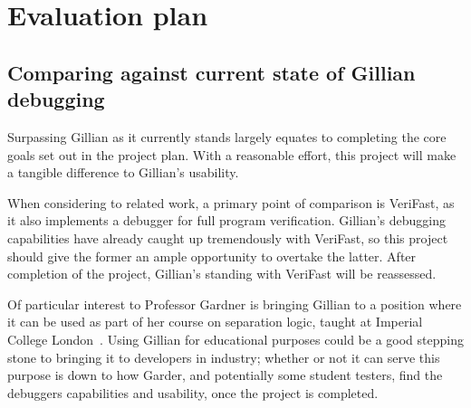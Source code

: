 \chapter{Evaluation plan}
\label{cha:eval}
\section{Comparing against current state of Gillian debugging}

Surpassing Gillian as it currently stands largely equates to completing the
core goals set out in the project plan. With a reasonable effort, this project
will make a tangible difference to Gillian's usability.

When considering to related work, a primary point of comparison is VeriFast, as
it also implements a debugger for full program verification. Gillian's
debugging capabilities have already caught up tremendously with VeriFast, so
this project should give the former an ample opportunity to overtake the latter.
After completion of the project, Gillian's standing with VeriFast will be
reassessed.

Of particular interest to Professor Gardner is bringing Gillian to a position
where it can be used as part of her course on separation logic, taught at
Imperial College London~\cite{sl-course}. Using Gillian for educational
purposes could be a good stepping stone to bringing it to developers in
industry; whether or not it can serve this purpose is down to how Garder, and
potentially some student testers, find the debuggers capabilities and
usability, once the project is completed.
